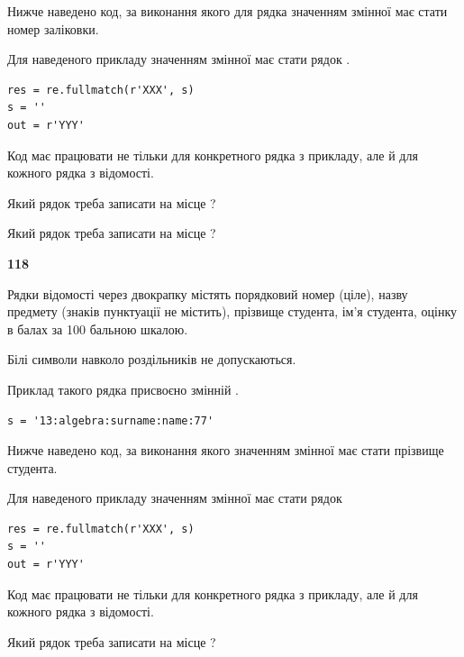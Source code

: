 Нижче наведено код, за виконання якого для рядка  значенням змінної  має стати номер заліковки.

Для наведеного прикладу значенням змінної  має стати рядок  .



\begin{verbatim}
res = re.fullmatch(r'XXX', s)
s = ''
out = r'YYY'
\end{verbatim}


Код має працювати не тільки для конкретного рядка з прикладу, але й для кожного рядка з відомості.




Який рядок треба записати на місце  ?\par
\vspace{5mm}


Який рядок треба записати на місце  ?\par


\newpage

{\begin {center}\textbf{ 118}\end {center}}\par
Рядки відомості через двокрапку містять порядковий номер (ціле), назву предмету (знаків пунктуації не містить), прізвище студента, ім'я студента, оцінку в балах за 100 бальною шкалою.

Білі символи навколо роздільників не допускаються.

Приклад такого рядка присвоєно змінній .



\begin{verbatim}
s = '13:algebra:surname:name:77'
\end{verbatim}


Нижче наведено код, за виконання якого значенням змінної  має стати прізвище студента.

Для наведеного прикладу значенням змінної  має стати рядок 



\begin{verbatim}
res = re.fullmatch(r'XXX', s)
s = ''
out = r'YYY'
\end{verbatim}


Код має працювати не тільки для конкретного рядка з прикладу, але й для кожного рядка з відомості.




Який рядок треба записати на місце  ?\par
\vspace{5mm}


